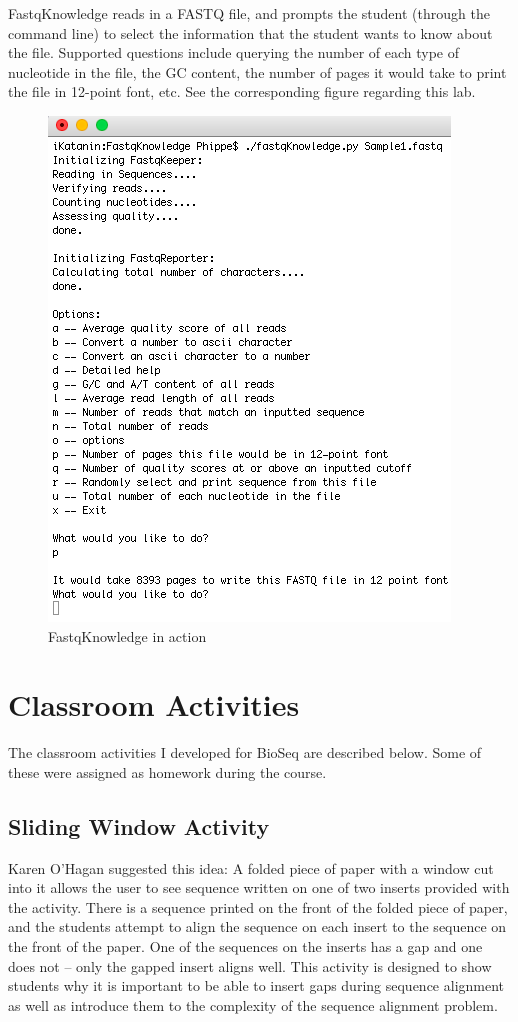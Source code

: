 \documentclass{report}
\begin{document}
FastqKnowledge reads in a FASTQ file, and prompts the student (through the command line) to select the information that the student wants to know about the file. Supported questions include querying the number of each type of nucleotide in the file, the GC content, the number of pages it would take to print the file in 12-point font, etc. See the corresponding figure regarding this lab.

\begin{figure}[h]
\centering
\includegraphics[scale=0.75]{fastqK.png}
\caption{FastqKnowledge in action}
\end{figure}


\section{Classroom Activities}
The classroom activities I developed for BioSeq are described below. Some of these were assigned as homework during the course. 

\subsection{Sliding Window Activity}
Karen O'Hagan suggested this idea: A folded piece of paper with a window cut into it allows the user to see sequence written on one of two inserts provided with the activity. There is a sequence printed on the front of the folded piece of paper, and the students attempt to align the sequence on each insert to the sequence on the front of the paper. One of the sequences on the inserts has a gap and one does not -- only the gapped insert aligns well. This activity is designed to show students why it is important to be able to insert gaps during sequence alignment as well as introduce them to the complexity of the sequence alignment problem.
\end{document}
